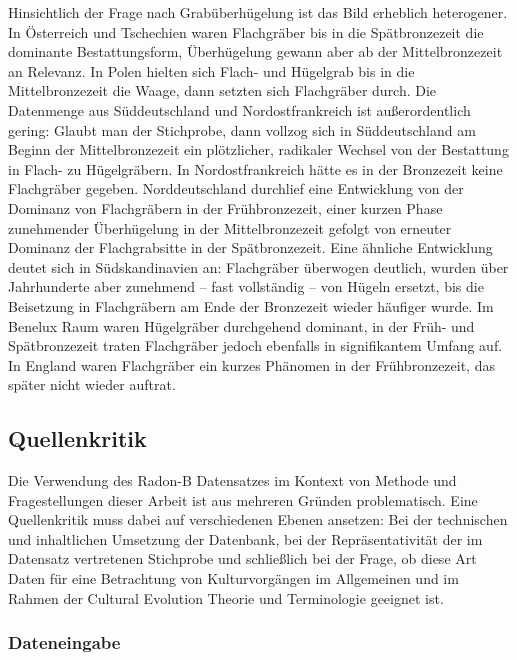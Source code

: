 \documentclass[openany,twoside,twocolumn]{book}
\begin{document}
Hinsichtlich der Frage nach Grabüberhügelung ist das Bild erheblich
heterogener. In Österreich und Tschechien waren Flachgräber bis in die
Spätbronzezeit die dominante Bestattungsform, Überhügelung gewann aber
ab der Mittelbronzezeit an Relevanz. In Polen hielten sich Flach- und
Hügelgrab bis in die Mittelbronzezeit die Waage, dann setzten sich
Flachgräber durch. Die Datenmenge aus Süddeutschland und
Nordostfrankreich ist außerordentlich gering: Glaubt man der Stichprobe,
dann vollzog sich in Süddeutschland am Beginn der Mittelbronzezeit ein
plötzlicher, radikaler Wechsel von der Bestattung in Flach- zu
Hügelgräbern. In Nordostfrankreich hätte es in der Bronzezeit keine
Flachgräber gegeben. Norddeutschland durchlief eine Entwicklung von der
Dominanz von Flachgräbern in der Frühbronzezeit, einer kurzen Phase
zunehmender Überhügelung in der Mittelbronzezeit gefolgt von erneuter
Dominanz der Flachgrabsitte in der Spätbronzezeit. Eine ähnliche
Entwicklung deutet sich in Südskandinavien an: Flachgräber überwogen
deutlich, wurden über Jahrhunderte aber zunehmend -- fast vollständig --
von Hügeln ersetzt, bis die Beisetzung in Flachgräbern am Ende der
Bronzezeit wieder häufiger wurde. Im Benelux Raum waren Hügelgräber
durchgehend dominant, in der Früh- und Spätbronzezeit traten Flachgräber
jedoch ebenfalls in signifikantem Umfang auf. In England waren
Flachgräber ein kurzes Phänomen in der Frühbronzezeit, das später nicht
wieder auftrat.

\hypertarget{source-criticism}{%
\subsection{Quellenkritik}\label{source-criticism}}

Die Verwendung des Radon-B Datensatzes im Kontext von Methode und
Fragestellungen dieser Arbeit ist aus mehreren Gründen problematisch.
Eine Quellenkritik muss dabei auf verschiedenen Ebenen ansetzen: Bei der
technischen und inhaltlichen Umsetzung der Datenbank, bei der
Repräsentativität der im Datensatz vertretenen Stichprobe und
schließlich bei der Frage, ob diese Art Daten für eine Betrachtung von
Kulturvorgängen im Allgemeinen und im Rahmen der Cultural Evolution
Theorie und Terminologie geeignet ist.

\hypertarget{dateneingabe}{%
\subsubsection{Dateneingabe}\label{dateneingabe}}
\end{document}
